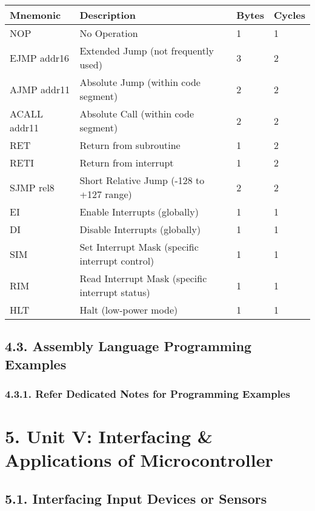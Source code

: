 \documentclass[
]{article}
\begin{document}
\begin{longtable}[]{@{}llll@{}}
\toprule
Mnemonic & Description & Bytes & Cycles \\
\midrule
\endhead
NOP & No Operation & 1 & 1 \\
EJMP addr16 & Extended Jump (not frequently used) & 3 & 2 \\
AJMP addr11 & Absolute Jump (within code segment) & 2 & 2 \\
ACALL addr11 & Absolute Call (within code segment) & 2 & 2 \\
RET & Return from subroutine & 1 & 2 \\
RETI & Return from interrupt & 1 & 2 \\
SJMP rel8 & Short Relative Jump (-128 to +127 range) & 2 & 2 \\
EI & Enable Interrupts (globally) & 1 & 1 \\
DI & Disable Interrupts (globally) & 1 & 1 \\
SIM & Set Interrupt Mask (specific interrupt control) & 1 & 1 \\
RIM & Read Interrupt Mask (specific interrupt status) & 1 & 1 \\
HLT & Halt (low-power mode) & 1 & 1 \\
\bottomrule
\end{longtable}

\hypertarget{43-assembly-language-programming-examples}{%
\subsection{4.3. Assembly Language Programming
Examples}\label{43-assembly-language-programming-examples}}

\hypertarget{431-refer-dedicated-notes-for-programming-examples}{%
\subsubsection{4.3.1. Refer Dedicated Notes for Programming
Examples}\label{431-refer-dedicated-notes-for-programming-examples}}

\hypertarget{5-unit-v-interfacing--applications-of-microcontroller}{%
\section{5. Unit V: Interfacing \& Applications of
Microcontroller}\label{5-unit-v-interfacing--applications-of-microcontroller}}

\hypertarget{51-interfacing-input-devices-or-sensors}{%
\subsection{5.1. Interfacing Input Devices or
Sensors}\label{51-interfacing-input-devices-or-sensors}}
\end{document}

